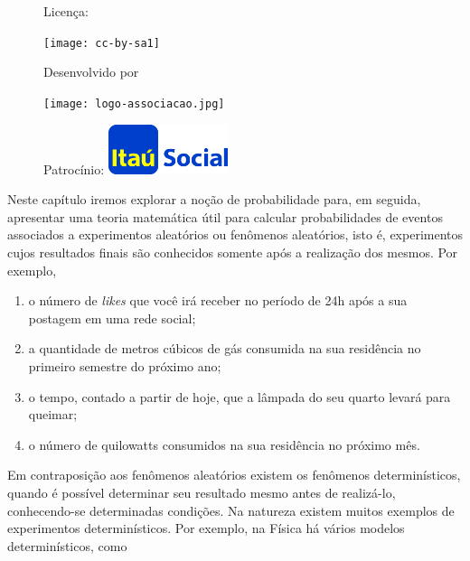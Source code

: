 \begin{figure}[b]
\begin{minipage}[l]{5cm}
\centering

{\large Licença:}

  \texttt{[image: cc-by-sa1]}
\end{minipage}\hfill
\begin{minipage}[c]{5cm}
\centering
{\large Desenvolvido por}

\texttt{[image: logo-associacao.jpg]}
\end{minipage}
\begin{minipage}[r]{5cm}
\centering

{\large Patrocínio:}
  \vspace{1em}
  \includegraphics[width=3.5cm]{itau}
\end{minipage}
\end{figure}

\mainmatter


\label{conceitosbasicos}
Neste capítulo iremos explorar a noção de probabilidade para, em seguida, apresentar uma teoria matemática útil para calcular probabilidades de eventos associados a experimentos aleatórios ou fenômenos aleatórios, isto é, experimentos cujos resultados finais são conhecidos somente após a realização dos mesmos. Por exemplo,

\begin{enumerate}
\item {} 
o número de \textit{likes} que você irá receber no período de 24h após a sua postagem em uma rede social;

\item {} 
a quantidade de metros cúbicos de gás consumida na sua residência no primeiro semestre do próximo ano;

\item {} 
o tempo, contado a partir de hoje, que a lâmpada do seu quarto levará para queimar;

\item {} 
o número de quilowatts consumidos na sua residência no próximo mês.
\end{enumerate}
Em contraposição aos fenômenos aleatórios existem os fenômenos determinísticos, quando é possível determinar seu resultado mesmo antes de realizá-lo, conhecendo-se determinadas condições. Na natureza existem muitos exemplos de experimentos determinísticos. Por exemplo, na Física há vários modelos determinísticos, como

